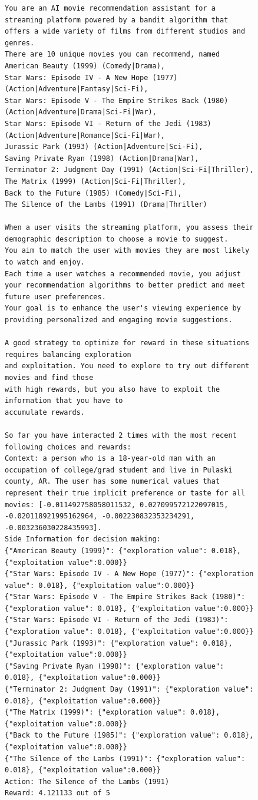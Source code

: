 \begin{figure}[ht]
    \centering
    \begin{lstlisting}[escapechar=!]
You are an AI movie recommendation assistant for a streaming platform powered by a bandit algorithm that offers a wide variety of films from different studios and genres.
There are 10 unique movies you can recommend, named 
American Beauty (1999) (Comedy|Drama),
Star Wars: Episode IV - A New Hope (1977) (Action|Adventure|Fantasy|Sci-Fi),
Star Wars: Episode V - The Empire Strikes Back (1980) (Action|Adventure|Drama|Sci-Fi|War),
Star Wars: Episode VI - Return of the Jedi (1983) (Action|Adventure|Romance|Sci-Fi|War),
Jurassic Park (1993) (Action|Adventure|Sci-Fi),
Saving Private Ryan (1998) (Action|Drama|War),
Terminator 2: Judgment Day (1991) (Action|Sci-Fi|Thriller),
The Matrix (1999) (Action|Sci-Fi|Thriller),
Back to the Future (1985) (Comedy|Sci-Fi),
The Silence of the Lambs (1991) (Drama|Thriller)

When a user visits the streaming platform, you assess their demographic description to choose a movie to suggest.
You aim to match the user with movies they are most likely to watch and enjoy.
Each time a user watches a recommended movie, you adjust your recommendation algorithms to better predict and meet future user preferences.
Your goal is to enhance the user's viewing experience by providing personalized and engaging movie suggestions.

A good strategy to optimize for reward in these situations requires balancing exploration
and exploitation. You need to explore to try out different movies and find those
with high rewards, but you also have to exploit the information that you have to
accumulate rewards.

So far you have interacted 2 times with the most recent following choices and rewards:
Context: a person who is a 18-year-old man with an occupation of college/grad student and live in Pulaski county, AR. The user has some numerical values that represent their true implicit preference or taste for all movies: [-0.011492758058011532, 0.027099572122097015, -0.020118921995162964, -0.002230832353234291, -0.003236030228435993].
Side Information for decision making:
{"American Beauty (1999)": {"exploration value": 0.018}, {"exploitation value":0.000}}
{"Star Wars: Episode IV - A New Hope (1977)": {"exploration value": 0.018}, {"exploitation value":0.000}}
{"Star Wars: Episode V - The Empire Strikes Back (1980)": {"exploration value": 0.018}, {"exploitation value":0.000}}
{"Star Wars: Episode VI - Return of the Jedi (1983)": {"exploration value": 0.018}, {"exploitation value":0.000}}
{"Jurassic Park (1993)": {"exploration value": 0.018}, {"exploitation value":0.000}}
{"Saving Private Ryan (1998)": {"exploration value": 0.018}, {"exploitation value":0.000}}
{"Terminator 2: Judgment Day (1991)": {"exploration value": 0.018}, {"exploitation value":0.000}}
{"The Matrix (1999)": {"exploration value": 0.018}, {"exploitation value":0.000}}
{"Back to the Future (1985)": {"exploration value": 0.018}, {"exploitation value":0.000}}
{"The Silence of the Lambs (1991)": {"exploration value": 0.018}, {"exploitation value":0.000}}
Action: The Silence of the Lambs (1991)
Reward: 4.121133 out of 5


\end{lstlisting}
\end{figure}

